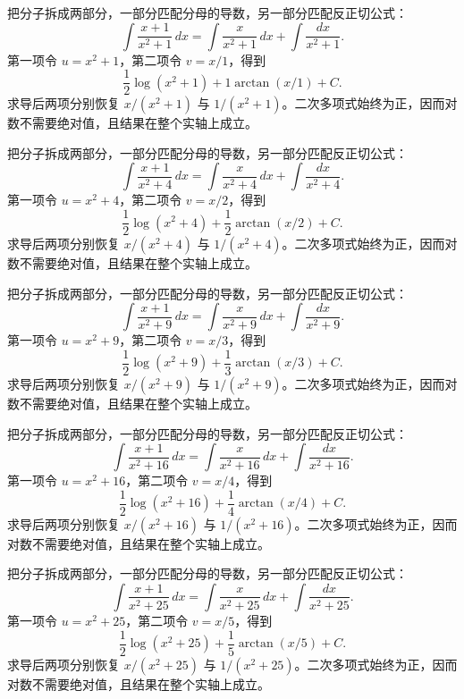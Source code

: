 \documentclass[12pt,fontset=fandol]{ctexart}
\begin{document}
\begin{solve}\label{ans:c13q19}
把分子拆成两部分，一部分匹配分母的导数，另一部分匹配反正切公式：
\[
\int\frac{x+1}{x^2+1}\,dx=\int\frac{x}{x^2+1}\,dx+\int\frac{dx}{x^2+1}.
\]
第一项令 $u=x^2+1$，第二项令 $v=x/1$，得到
\[
\frac12\log(x^2+1)+1\arctan(x/1)+C.
\]
求导后两项分别恢复 $x/(x^2+1)$ 与 $1/(x^2+1)$。二次多项式始终为正，因而对数不需要绝对值，且结果在整个实轴上成立。
\end{solve}

\begin{solve}\label{ans:c13q20}
把分子拆成两部分，一部分匹配分母的导数，另一部分匹配反正切公式：
\[
\int\frac{x+1}{x^2+4}\,dx=\int\frac{x}{x^2+4}\,dx+\int\frac{dx}{x^2+4}.
\]
第一项令 $u=x^2+4$，第二项令 $v=x/2$，得到
\[
\frac12\log(x^2+4)+\frac{1}{2}\arctan(x/2)+C.
\]
求导后两项分别恢复 $x/(x^2+4)$ 与 $1/(x^2+4)$。二次多项式始终为正，因而对数不需要绝对值，且结果在整个实轴上成立。
\end{solve}

\begin{solve}\label{ans:c13q21}
把分子拆成两部分，一部分匹配分母的导数，另一部分匹配反正切公式：
\[
\int\frac{x+1}{x^2+9}\,dx=\int\frac{x}{x^2+9}\,dx+\int\frac{dx}{x^2+9}.
\]
第一项令 $u=x^2+9$，第二项令 $v=x/3$，得到
\[
\frac12\log(x^2+9)+\frac{1}{3}\arctan(x/3)+C.
\]
求导后两项分别恢复 $x/(x^2+9)$ 与 $1/(x^2+9)$。二次多项式始终为正，因而对数不需要绝对值，且结果在整个实轴上成立。
\end{solve}

\begin{solve}\label{ans:c13q22}
把分子拆成两部分，一部分匹配分母的导数，另一部分匹配反正切公式：
\[
\int\frac{x+1}{x^2+16}\,dx=\int\frac{x}{x^2+16}\,dx+\int\frac{dx}{x^2+16}.
\]
第一项令 $u=x^2+16$，第二项令 $v=x/4$，得到
\[
\frac12\log(x^2+16)+\frac{1}{4}\arctan(x/4)+C.
\]
求导后两项分别恢复 $x/(x^2+16)$ 与 $1/(x^2+16)$。二次多项式始终为正，因而对数不需要绝对值，且结果在整个实轴上成立。
\end{solve}

\begin{solve}\label{ans:c13q23}
把分子拆成两部分，一部分匹配分母的导数，另一部分匹配反正切公式：
\[
\int\frac{x+1}{x^2+25}\,dx=\int\frac{x}{x^2+25}\,dx+\int\frac{dx}{x^2+25}.
\]
第一项令 $u=x^2+25$，第二项令 $v=x/5$，得到
\[
\frac12\log(x^2+25)+\frac{1}{5}\arctan(x/5)+C.
\]
求导后两项分别恢复 $x/(x^2+25)$ 与 $1/(x^2+25)$。二次多项式始终为正，因而对数不需要绝对值，且结果在整个实轴上成立。
\end{solve}
\end{document}
